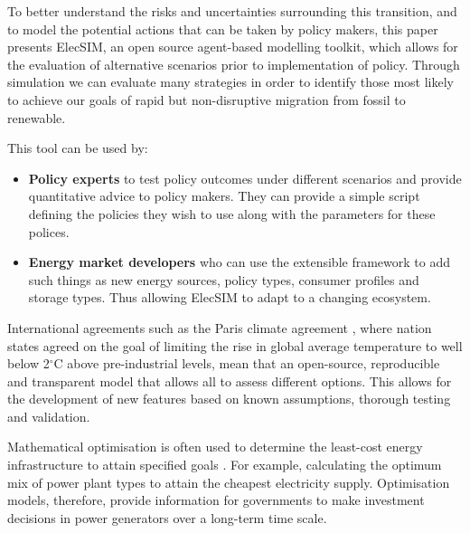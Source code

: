 %

To better understand the risks and uncertainties surrounding this transition, and to model the potential actions that can be taken by policy makers, this paper presents ElecSIM, an open source agent-based modelling toolkit, which allows for the evaluation of alternative scenarios prior to implementation of policy. Through simulation we can evaluate many strategies in order to identify those most likely to achieve our goals of rapid but non-disruptive migration from fossil to renewable.

This tool can be used by:
\begin{itemize}
	\item {\bf Policy experts} to test policy outcomes under different scenarios and provide quantitative advice to policy makers. They can provide a simple script defining the policies they wish to use along with the parameters for these polices.
	\item {\bf Energy market developers} who can use the extensible framework to add such things as new energy sources, policy types, consumer profiles and storage types. Thus allowing ElecSIM to adapt to a changing ecosystem.
\end{itemize}
International agreements such as the Paris climate agreement \cite{May2002}, where nation states agreed on the goal of limiting the rise in global average temperature to well below 2$^\circ$C above pre-industrial levels, mean that an open-source, reproducible and transparent model that allows all to assess different options. This allows for the development of new features based on known assumptions, thorough testing and validation.

Mathematical optimisation is often used to determine the least-cost energy infrastructure to attain specified goals \cite{Papadelis2012}. For example, calculating the optimum mix of power plant types to attain the cheapest electricity supply. Optimisation models, therefore, provide information for governments to make investment decisions in power generators over a long-term time scale. 

